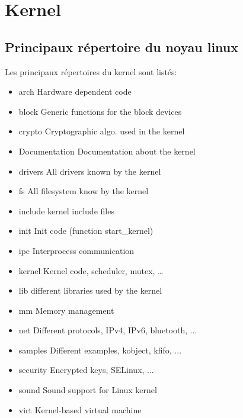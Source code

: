 \section{Kernel}
\subsection{Principaux répertoire du noyau linux}
Les principaux répertoires du kernel sont listés:
\begin{itemize}
\item arch Hardware dependent code
\item block Generic functions for the block devices
\item crypto Cryptographic algo. used in the kernel
\item Documentation Documentation about the kernel
\item drivers All drivers known by the kernel
\item fs All filesystem know by the kernel
\item include kernel include files
\item init Init code (function start\_kernel)
\item ipc Interprocess communication
\item kernel Kernel code, scheduler, mutex, … 
\item lib different libraries used by the kernel
\item mm Memory management
\item net Different protocols, IPv4, IPv6, bluetooth, ...
\item samples Different examples, kobject, kfifo, ...
\item security Encrypted keys, SELinux, ...
\item sound Sound support for Linux kernel
\item virt Kernel-based virtual machine
\end{itemize}
